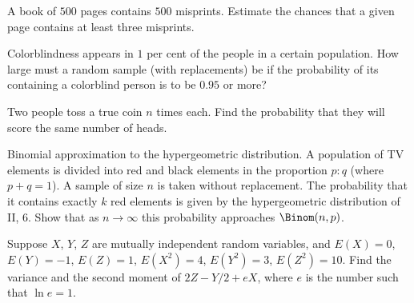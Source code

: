 \begin{problem}[Handout 8, \# 13]
  A book of \(500\) pages contains \(500\) misprints. Estimate the chances
  that a given page contains at least three misprints.
\end{problem}
\begin{solution}

\end{solution}
\newpage

\begin{problem}[Handout 8, \# 14]
  Colorblindness appears in \(1\) per cent of the people in a certain
  population. How large must a random sample (with replacements) be if the
  probability of its containing a colorblind person is to be \(0.95\) or more?
\end{problem}
\begin{solution}

\end{solution}
\newpage

\begin{problem}[Handout 8, \# 15]
  Two people toss a true coin \(n\) times each. Find the probability that
  they will score the same number of heads.
\end{problem}
\begin{solution}

\end{solution}
\newpage

\begin{problem}[Handout 8, \# 16]
  Binomial approximation to the hypergeometric distribution. A population
  of TV elements is divided into red and black elements in the proportion
  \(p:q\) (where \(p+q=1\)). A sample of size \(n\) is taken without
  replacement. The probability that it contains exactly \(k\) red elements
  is given by the hypergeometric distribution of II, 6. Show that as
  \(n\to\infty\) this probability approaches \(\Binom(n,p)\).
\end{problem}
\begin{solution}

\end{solution}
\newpage

\begin{problem}[Handout 9, \# 3]
  Suppose \(X\), \(Y\), \(Z\) are mutually independent random variables,
  and \(E(X)=0\), \(E(Y)=-1\), \(E(Z)=1\), \(E(X^2)=4\), \(E(Y^2)=3\),
  \(E(Z^2)=10\). Find the variance and the second moment of \(2Z-Y/2+e X\),
  where \(e\) is the number such that \(\ln e=1\).
\end{problem}
\begin{solution}

\end{solution}
\newpage

